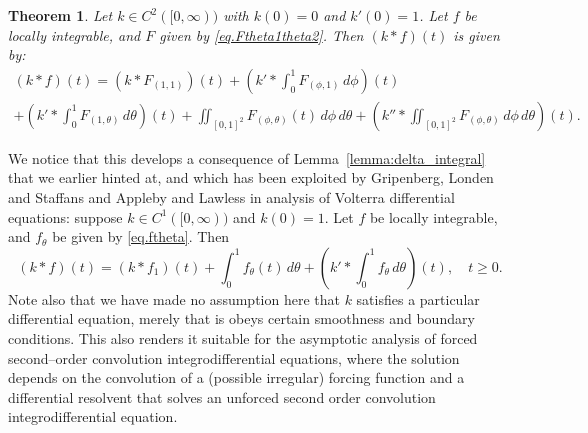 \documentclass[10pt,reqno]{amsart}
\newtheorem{theorem}{Theorem}
\theoremstyle{definition}
\begin{document}
	\begin{theorem} \label{thm.xrepF}
		Let $k \in C^2([0, \infty))$ with $k(0)=0$ and $k'(0)=1$. Let $f$ be locally integrable, and $F$ given by \eqref{eq.Ftheta1theta2}. 
		Then $(k * f)(t)$ is given by:
		\begin{multline} \label{eq.x0y2intermsofF}
			(k * f)(t) = (k * F_{(1,1)})(t) + \left( k' * \int_0^1 F_{(\phi, 1)} \, d\phi \right)(t) \\
			+ \left( k' * \int_0^1 F_{(1, \theta)} \, d\theta \right)(t) + \iint_{[0,1]^2} F_{(\phi, \theta)}(t) \, d\phi \, d\theta + \left( k'' * \iint_{[0,1]^2} F_{(\phi, \theta)} \, d\phi \, d\theta \right)(t).
		\end{multline}
	\end{theorem}
	We notice that this develops a consequence of Lemma~\ref{lemma:delta_integral} that we earlier hinted at, and which has been exploited by Gripenberg, Londen and Staffans and Appleby and Lawless in analysis of Volterra differential equations: suppose $k\in C^1([0,\infty))$ and $k(0)=1$. Let $f$ be locally integrable, and $f_\theta$ be given by \eqref{eq.ftheta}. Then 
	\[
	(k\ast f)(t)=(k\ast f_1)(t)+\int_0^1 f_\theta(t)\,d\theta + \left(k'\ast \int_0^1 f_\theta \,d\theta\right)(t), \quad t\geq 0.
	\] 
	Note also that we have made no assumption here that $k$ satisfies a particular differential equation, merely that is obeys certain smoothness and boundary conditions. This also renders it suitable for the asymptotic analysis of forced second--order convolution integrodifferential equations, where the solution depends on the convolution of a (possible irregular) forcing function and a differential resolvent that solves an unforced second order convolution integrodifferential equation.  
	
\end{document}
